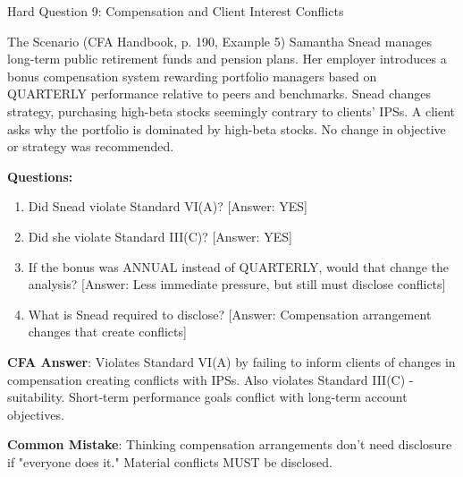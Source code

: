 \documentclass{beamer}
\begin{document}
	\begin{frame}{Hard Question 9: Compensation and Client Interest Conflicts}
		\begin{block}{The Scenario (CFA Handbook, p. 190, Example 5)}
			Samantha Snead manages long-term public retirement funds and pension plans. Her employer introduces a bonus compensation system rewarding portfolio managers based on QUARTERLY performance relative to peers and benchmarks. Snead changes strategy, purchasing high-beta stocks seemingly contrary to clients' IPSs. A client asks why the portfolio is dominated by high-beta stocks. No change in objective or strategy was recommended.
		\end{block}
		
		\vspace{0.2cm}
		\textbf{Questions:}
		\begin{enumerate}
			\item Did Snead violate Standard VI(A)? \textcolor{cfared}{[Answer: YES]}
			\item Did she violate Standard III(C)? \textcolor{cfared}{[Answer: YES]}
			\item If the bonus was ANNUAL instead of QUARTERLY, would that change the analysis? \textcolor{cfared}{[Answer: Less immediate pressure, but still must disclose conflicts]}
			\item What is Snead required to disclose? \textcolor{cfared}{[Answer: Compensation arrangement changes that create conflicts]}
		\end{enumerate}
		
		\vspace{0.2cm}
		\textcolor{cfablue}{\textbf{CFA Answer}}: Violates Standard VI(A) by failing to inform clients of changes in compensation creating conflicts with IPSs. Also violates Standard III(C) - suitability. Short-term performance goals conflict with long-term account objectives.
		
		\vspace{0.1cm}
		\textcolor{cfared}{\textbf{Common Mistake}}: Thinking compensation arrangements don't need disclosure if "everyone does it." Material conflicts MUST be disclosed.
	\end{frame}
	
\end{document}

